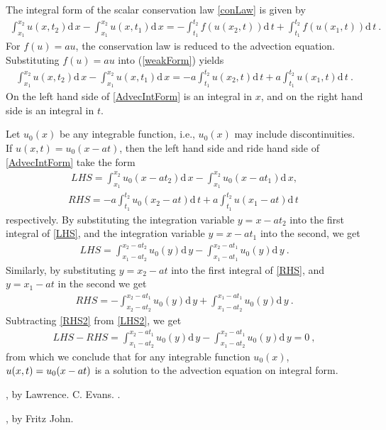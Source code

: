 \documentclass[10pt,letterpaper]{article}
\newcommand{\dif}[1][]{\mathrm{d} {#1}\,}
\newcommand{\frb}[1]{ \left(  {#1} \right) }
\theoremstyle{break}
\begin{document}
\begin{solution}
	The integral form of the scalar conservation law \eqref{conLaw} is given by 
	\begin{gather} 
		\int_{x_{1}}^{x_{2}}u\frb{x,t_{2}} \dif x
				-\int_{x_{1}}^{x_{2}}u\frb{x,t_{1}} \dif x
			=-\int_{t_{1}}^{t_{2}}f\frb{u\frb{x_{2},t}} \dif t
				+\int_{t_{1}}^{t_{2}}f\frb{u\frb{x_{1},t}} \dif t\ .
	\end{gather}
	For $f(u)=au$, the conservation law is reduced to the advection equation. Substituting $f\!\left(u\right)=au$ into (\ref{weakForm}) yields
	\begin{gather} \label{AdvecIntForm}
		\int_{x_{1}}^{x_{2}}u\frb{x,t_{2}} \dif x
				-\int_{x_{1}}^{x_{2}}u\frb{x,t_{1}} \dif x
			=-a \int_{t_{1}}^{t_{2}} u\frb{x_{2},t} \dif t
				+a\int_{t_{1}}^{t_{2}} u\frb{x_{1},t} \dif t\  .
	\end{gather}
	On the left hand side of \eqref{AdvecIntForm} is an integral in $x$, and on the right hand side is an integral in $t$.
	
	Let $u_{0}(x)$ be any integrable function, i.e., $u_{0}(x)$ may include discontinuities. If $u(x,t)=u_0(x-at)$, then the left hand side and ride hand side of \eqref{AdvecIntForm} take the form
	\begin{gather} \label{LHS}
		LHS=\int_{x_{1}}^{x_{2}}u_{0}\frb{x-at_{2}}\dif x
				-\int_{x_{1}}^{x_{2}}u_{0}\frb{x-at_{1}} \dif x,
	\end{gather}
	\begin{gather} \label{RHS}
		RHS=-a\int_{t_{1}}^{t_{2}}u_{0}\frb{x_{2}-at}\dif t
				+a\int_{t_{1}}^{t_{2}}u\frb{x_{1}-at}\dif t\ 
	\end{gather}
	respectively. By substituting the integration variable $y=x-at_{2}$ into the first integral of \eqref{LHS}, and the integration variable $y=x-at_{1}$ into the second, we get
	\begin{gather} \label{LHS2}
		LHS=\int_{x_{1}-at_{2}}^{x_{2}-at_{2}}u_{0}\frb{y}\dif y
			-\int_{x_{1}-at_{1}}^{x_{2}-at_{1}}u_{0}\frb{y}\dif y\ .
	\end{gather}
	Similarly, by substituting $y=x_{2}-at$ into the first integral of \eqref{RHS}, and $y=x_{1}-at$ in the second we get 
	\begin{gather} \label{RHS2}
		RHS=- \int_{x_{2}-at_{2}}^{x_{2}-at_{1}}u_{0}\frb{y}\dif y
			+\int_{x_{1}-at_{2}}^{x_{1}-at_{1}}u_{0}\frb{y} \dif y\ .
	\end{gather}
	Subtracting \eqref{RHS2} from \eqref{LHS2}, we get
	\begin{gather}
		LHS-RHS=\int_{x_{1}-at_{2}}^{x_{2}-at_{1}}u_{0}\frb{y} \dif y
			-\int_{x_{1}-at_{2}}^{x_{2}-at_{1}}u_{0}\frb{y} \dif y=0\ ,
	\end{gather}
	from which we conclude that for any integrable function $u_{0}\!\left(x\right)$, $u\!\left(x,t\right)=u_{0}\text{\!}\left(x-at\right)$ is a solution to the advection equation on integral form.
\end{solution}
	



\begin{thebibliography}{----}
	, by Lawrence. C. Evans.
	.
	
	, by Fritz John.	
\end{thebibliography}
\end{document}

